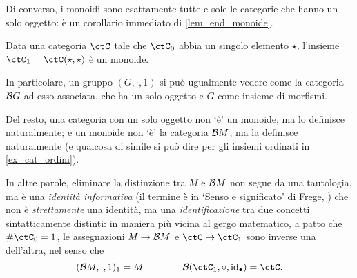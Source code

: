 Di converso, i monoidi sono esattamente tutte e sole le categorie che hanno un solo oggetto: è un corollario immediato di \ref{lem_end_monoide}.
\begin{theorem}\label{cat_sonomon}
	Data una categoria \(\ctC\) tale che \(\ctC_0\) abbia un singolo elemento \(\star\), l'insieme \(\ctC_1 = \Hom{\ctC}(\star,\star)\) è un monoide.
\end{theorem}
\begin{corollary}\label{cor_cat_mon}
	In particolare, un gruppo \((G,\cdot,1)\) si può ugualmente vedere come la categoria \(\mathcal{B} G\) ad esso associata, che ha un solo oggetto e \(G\) come insieme di morfismi.
\end{corollary}
\begin{remark}
	Del resto, una categoria con un solo oggetto non `è' un monoide, ma lo definisce naturalmente; e un monoide non `è' la categoria \(\mathcal{B} M\), ma la definisce naturalmente (e qualcosa di simile si può dire per gli insiemi ordinati in \ref{ex_cat_ordini}).

	In altre parole, eliminare la distinzione tra \(M\) e \(\mathcal{B} M\) non segue da una tautologia, ma è una \emph{identità informativa} (il termine è in `Senso e significato' di Frege, \cite{frege1892sinn}) che non è \emph{strettamente} una identità, ma una \emph{identificazione} tra due concetti sintatticamente distinti: in maniera più vicina al gergo matematico, a patto che \(\#\ctC_0 = 1\), le assegnazioni \(M\mapsto \mathcal{B} M\) e \(\ctC\mapsto \ctC_1\) sono inverse una dell'altra, nel senso che
	\[(\susp M,\cdot,1)_1 = M\qquad\qquad\susp(\ctC_1,\cmp,\id_\bullet) = \ctC.\]
\end{remark}
